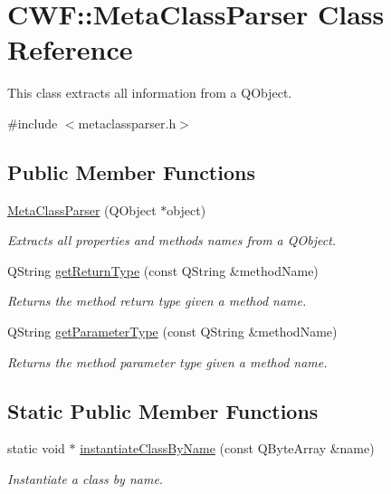 \hypertarget{class_c_w_f_1_1_meta_class_parser}{\section{C\+W\+F\+:\+:Meta\+Class\+Parser Class Reference}
\label{class_c_w_f_1_1_meta_class_parser}
}


This class extracts all information from a Q\+Object.  




{\ttfamily \#include $<$metaclassparser.\+h$>$}

\subsection*{Public Member Functions}
\begin{DoxyCompactItemize}
\item 
\hyperlink{class_c_w_f_1_1_meta_class_parser_af831499a518f79c328a71d8d8ec53b0f}{Meta\+Class\+Parser} (Q\+Object $\ast$object)
\begin{DoxyCompactList}\small\item\em Extracts all properties and methods names from a Q\+Object. \end{DoxyCompactList}\item 
Q\+String \hyperlink{class_c_w_f_1_1_meta_class_parser_a2bd37870867411d803411339d1d97c49}{get\+Return\+Type} (const Q\+String \&method\+Name)
\begin{DoxyCompactList}\small\item\em Returns the method return type given a method name. \end{DoxyCompactList}\item 
Q\+String \hyperlink{class_c_w_f_1_1_meta_class_parser_a560be3a1d52f822eab715faa0b1fbe15}{get\+Parameter\+Type} (const Q\+String \&method\+Name)
\begin{DoxyCompactList}\small\item\em Returns the method parameter type given a method name. \end{DoxyCompactList}\end{DoxyCompactItemize}
\subsection*{Static Public Member Functions}
\begin{DoxyCompactItemize}
\item 
static void $\ast$ \hyperlink{class_c_w_f_1_1_meta_class_parser_a0d9a5f5b026f0fc7e257fa58bbc72adf}{instantiate\+Class\+By\+Name} (const Q\+Byte\+Array \&name)
\begin{DoxyCompactList}\small\item\em Instantiate a class by name. \end{DoxyCompactList}\end{DoxyCompactItemize}
